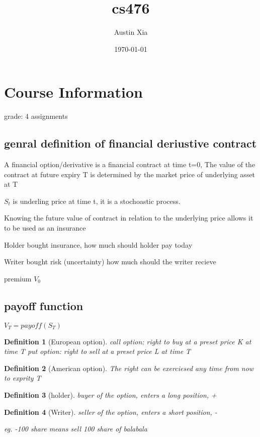 \documentclass[10pt]{article}
\theoremstyle{break}
\newtheorem{defn}{Definition}[subsection]
\begin{document}
\let\ref\Cref

\title{\bf{cs476}}
\date{\today}
\author{Austin Xia}

\maketitle
\newpage
\tableofcontents
\listoffigures
\listoftables
\newpage
\section{Course Information}
grade: 4 assignments
\subsection{genral definition of financial deriustive contract}
A financial option/derivative is a financial contract at time t=0,
The value of the contract at future expiry T is determined by the market price of 
underlying asset at T


$S_t$ is underling price at time t, it is a stochoastic process.

Knowing the future value of contract in relation to the underlying price allows it to be used as an insurance

Holder bought insurance, how much should holder pay today

Writer bought risk (uncertainty) how much should the writer recieve

premium $V_0$

\subsection{payoff function}

$V_T=payoff(S_T)$

\begin{defn}[European option]
call option: right to buy at a preset price K at time T
put option: right to sell at a preset price L at time T
\end{defn}


\begin{defn}[American option]
The right can be exerciesed any time from now to exprity T
\end{defn}

\begin{defn}[holder]
    buyer of the option, enters a long position, +
\end{defn}

\begin{defn}[Writer]
    seller of the option, enters a short position, -

    eg. -100 share means sell 100 share of balabala
\end{defn}
\end{document}
